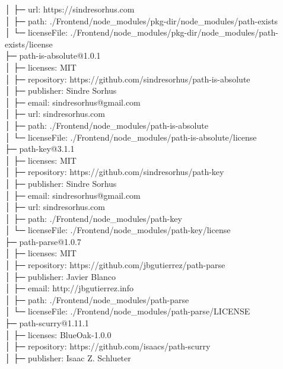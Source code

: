 \documentclass[
    paper=a4,
    twoside=false,
    parskip=half,
    listof=entryprefix,
    listof=totoc,
    index=totoc,
    bibliography=totoc,
    headsepline,
]{scrbook}
\begin{document}
    │  ├─ url: https://sindresorhus.com\\
    │  ├─ path: ./Frontend/node\_modules/pkg-dir/node\_modules/path-exists\\
    │  └─ licenseFile: ./Frontend/node\_modules/pkg-dir/node\_modules/path-exists/license\\
    ├─ path-is-absolute@1.0.1\\
    │  ├─ licenses: MIT\\
    │  ├─ repository: https://github.com/sindresorhus/path-is-absolute\\
    │  ├─ publisher: Sindre Sorhus\\
    │  ├─ email: sindresorhus@gmail.com\\
    │  ├─ url: sindresorhus.com\\
    │  ├─ path: ./Frontend/node\_modules/path-is-absolute\\
    │  └─ licenseFile: ./Frontend/node\_modules/path-is-absolute/license\\
    ├─ path-key@3.1.1\\
    │  ├─ licenses: MIT\\
    │  ├─ repository: https://github.com/sindresorhus/path-key\\
    │  ├─ publisher: Sindre Sorhus\\
    │  ├─ email: sindresorhus@gmail.com\\
    │  ├─ url: sindresorhus.com\\
    │  ├─ path: ./Frontend/node\_modules/path-key\\
    │  └─ licenseFile: ./Frontend/node\_modules/path-key/license\\
    ├─ path-parse@1.0.7\\
    │  ├─ licenses: MIT\\
    │  ├─ repository: https://github.com/jbgutierrez/path-parse\\
    │  ├─ publisher: Javier Blanco\\
    │  ├─ email: http://jbgutierrez.info\\
    │  ├─ path: ./Frontend/node\_modules/path-parse\\
    │  └─ licenseFile: ./Frontend/node\_modules/path-parse/LICENSE\\
    ├─ path-scurry@1.11.1\\
    │  ├─ licenses: BlueOak-1.0.0\\
    │  ├─ repository: https://github.com/isaacs/path-scurry\\
    │  ├─ publisher: Isaac Z. Schlueter\\
\end{document}

